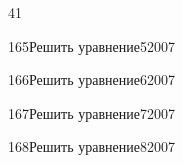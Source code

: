 \begin{TrigSourcePage}{41}
\begin{TrigExercise}{165}{Решить уравнение}{5}{2007}
\end{TrigExercise}
\begin{TrigExercise}{166}{Решить уравнение}{6}{2007}
\end{TrigExercise}
\begin{TrigExercise}{167}{Решить уравнение}{7}{2007}
\end{TrigExercise}
\begin{TrigExercise}{168}{Решить уравнение}{8}{2007}
\end{TrigExercise}
\end{TrigSourcePage}

